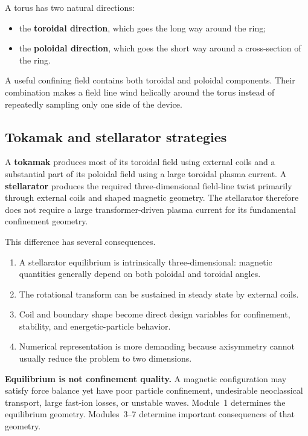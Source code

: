 A torus has two natural directions:
\begin{itemize}[leftmargin=1.6em]
\item the \textbf{toroidal direction}, which goes the long way around the ring;
\item the \textbf{poloidal direction}, which goes the short way around a cross-section of the ring.
\end{itemize}
A useful confining field contains both toroidal and poloidal components. Their combination makes a field line wind helically around the torus instead of repeatedly sampling only one side of the device.

\subsection{Tokamak and stellarator strategies}
A \textbf{tokamak} produces most of its toroidal field using external coils and a substantial part of its poloidal field using a large toroidal plasma current. A \textbf{stellarator} produces the required three-dimensional field-line twist primarily through external coils and shaped magnetic geometry. The stellarator therefore does not require a large transformer-driven plasma current for its fundamental confinement geometry.

This difference has several consequences.
\begin{enumerate}[leftmargin=1.6em]
\item A stellarator equilibrium is intrinsically three-dimensional: magnetic quantities generally depend on both poloidal and toroidal angles.
\item The rotational transform can be sustained in steady state by external coils.
\item Coil and boundary shape become direct design variables for confinement, stability, and energetic-particle behavior.
\item Numerical representation is more demanding because axisymmetry cannot usually reduce the problem to two dimensions.
\end{enumerate}

\begin{notebox}
\textbf{Equilibrium is not confinement quality.} A magnetic configuration may satisfy force balance yet have poor particle confinement, undesirable neoclassical transport, large fast-ion losses, or unstable waves. Module~1 determines the equilibrium geometry. Modules~3--7 determine important consequences of that geometry.
\end{notebox}

